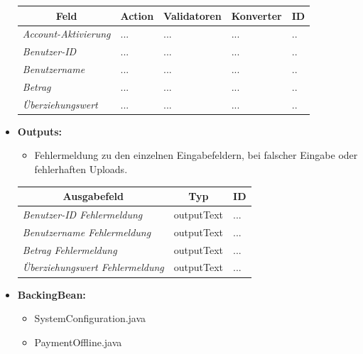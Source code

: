 \begin{itemize}
\begin{center}
\begin{longtable}{|p{3cm} |p{4cm} | p{4cm}|p{3cm} |p{2cm}|}
						\hline \multicolumn{1}{|c|}{\textbf{Feld}} & \multicolumn{1}{|c|}{\textbf{Action}} & \multicolumn{1}{|c|}{\textbf{Validatoren}}  &  \multicolumn{1}{|c|}{\textbf{Konverter}} &  \multicolumn{1}{|c|}{\textbf{ID}} \\ \hline
						\endfirsthead
						\hline
						\endlastfoot
						\textit{Account-Aktivierung} & ... & ... & ... & ..\\ \hline
						\textit{Benutzer-ID} & ... & ... & ... & ..\\ \hline
						\textit{Benutzername} & ... & ... & ... & ..\\ \hline
						\textit{Betrag} & ... & ... & ... & ..\\ \hline
						\textit{Überziehungswert} & ... & ... & ... & ..\\ \hline
					\end{longtable}
				\end{center}
			\item \textbf{Outputs:}
			\begin{itemize}
				\item Fehlermeldung zu den einzelnen Eingabefeldern, bei falscher Eingabe oder fehlerhaften Uploads.
			\end{itemize}

					\begin{center}
						\begin{longtable}{|p{5cm} | p{4cm}|p{3cm}|}
							
							\hline \multicolumn{1}{|c|}{\textbf{Ausgabefeld}} & \multicolumn{1}{|c|}{\textbf{Typ}}  &  \multicolumn{1}{|c|}{\textbf{ID}} \\ \hline
							\endfirsthead
							\hline
							\endlastfoot
							\textit{Benutzer-ID Fehlermeldung}  & outputText & ... \\ \hline
							\textit{Benutzername Fehlermeldung}  & outputText & ... \\ \hline
							\textit{Betrag Fehlermeldung} & outputText & ...\\ \hline
							\textit{Überziehungswert Fehlermeldung} & outputText & ...\\ \hline
						\end{longtable}
					\end{center}
			\item \textbf{BackingBean:}
			\begin{itemize}
				\item SystemConfiguration.java
				\item PaymentOffline.java
			\end{itemize}
		\end{itemize}
		
